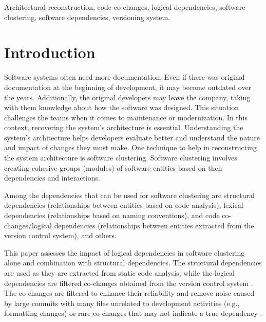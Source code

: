 \documentclass{ieeeaccess}
\begin{document}
\begin{keywords}
Architectural reconstruction, code co-changes, logical dependencies, software clustering, software dependencies, versioning system.
\end{keywords}

\titlepgskip=-21pt

\maketitle

\section{Introduction}
\label{sec:introduction}

Software systems often need more documentation. Even if there was original documentation at the beginning of development, it may become outdated over the years. Additionally, the original developers may leave the company, taking with them knowledge about how the software was designed. This situation challenges the teams when it comes to maintenance or modernization. In this context, recovering the system's architecture is essential. Understanding the system's architecture helps developers evaluate better and understand the nature and impact of changes they must make. One technique to help in reconstructing the system architecture is software clustering. Software clustering involves creating cohesive groups (modules) of software entities based on their dependencies and interactions.

Among the dependencies that can be used for software clustering are structural dependencies (relationships between entities based on code analysis), lexical dependencies (relationships based on naming conventions), and code co-changes/logical dependencies (relationships between entities extracted from the version control system), and others.

This paper assesses the impact of logical dependencies in software clustering alone and combination with structural dependencies. The structural dependencies are used as they are extracted from static code analysis, while the logical dependencies are filtered co-changes obtained from the version control system \cite{b15}. The co-changes are filtered to enhance their reliability and remove noise caused by large commits with many files unrelated to development activities (e.g., formatting changes) or rare co-changes that may not indicate a true dependency \cite{b1}.
\end{document}
